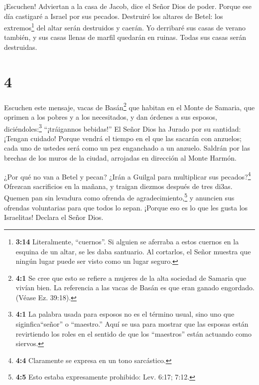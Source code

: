  ¡Escuchen! Adviertan a la casa de Jacob, dice el Señor
Dios de poder.  Porque ese día castigaré a Israel por sus
pecados. Destruiré los altares de Betel: los extremos\footnote{\textbf{3:14}
  Literalmente, ``cuernos''. Si alguien se aferraba a estos cuernos en
  la esquina de un altar, se les daba santuario. Al cortarlos, el Señor
  muestra que ningún lugar puede ser visto como un lugar seguro.} del
altar serán destruidos y caerán.  Yo derribaré sus casas de
verano también, y sus casas llenas de marfil quedarán en ruinas. Todas
sus casas serán destruidas.

\hypertarget{section-3}{%
\section{4}\label{section-3}}

 Escuchen este mensaje, vacas de Basán\footnote{\textbf{4:1}
  Se cree que esto se refiere a mujeres de la alta sociedad de Samaria
  que vivían bien. La referencia a las vacas de Basán es que eran ganado
  engordado. (Véase Ez. 39:18).} que habitan en el Monte de Samaria, que
oprimen a los pobres y a los necesitados, y dan órdenes a sus esposos,
diciéndoles:\footnote{\textbf{4:1} La palabra usada para esposos no es
  el término usual, sino uno que siginfica``señor'' o ``maestro.'' Aquí
  se usa para mostrar que las esposas están revirtiendo los roles en el
  sentido de que los ``maestros'' están actuando como siervos.}
``¡tráigannos bebidas!''  El Señor Dios ha Jurado por su
santidad: ¡Tengan cuidado! Porque vendrá el tiempo en el que las sacarán
con anzuelos; cada uno de ustedes será como un pez enganchado a un
anzuelo.  Saldrán por las brechas de los muros de la ciudad,
arrojadas en dirección al Monte Harmón.

 ¿Por qué no van a Betel y pecan? ¿Irán a Guilgal para
multiplicar sus pecados?\footnote{\textbf{4:4} Claramente se expresa en
  un tono sarcástico.} Ofrezcan sacrificios en la mañana, y traigan
diezmos después de tres di3as.  Quemen pan sin levadura como
ofrenda de agradecimiento,\footnote{\textbf{4:5} Esto estaba
  expresamente prohibido: Lev. 6:17; 7:12.} y anuncien sus ofrendas
voluntarias para que todos lo sepan. ¡Porque eso es lo que les gusta los
Israelitas! Declara el Señor Dios.

